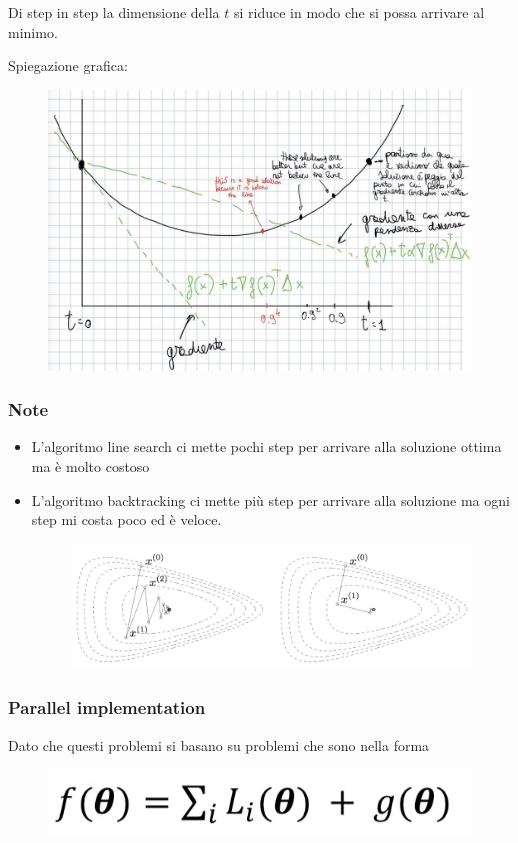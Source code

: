 \documentclass[14pt]{extreport}
\begin{document}
Di step in step la dimensione della $t$ si riduce in modo che si possa arrivare al minimo.

Spiegazione grafica: 

\begin{figure}[H]
\centering
\includegraphics[width=0.7\linewidth]{244.jpeg}
\end{figure}

\subsubsection{Note}

\begin{itemize}
\item L'algoritmo line search ci mette pochi step per arrivare alla soluzione ottima ma è molto costoso
\item L'algoritmo backtracking ci mette più step per arrivare alla soluzione ma ogni step mi costa poco ed è veloce. \begin{figure}[H]
\centering
\includegraphics[width=0.7\linewidth]{243.jpeg}
\end{figure}
\end{itemize}

\subsubsection{Parallel implementation}

Dato che questi problemi si basano su problemi che sono nella forma

\begin{figure}[H]
\centering
\includegraphics[width=0.7\linewidth]{245.jpeg}
\end{figure}
\end{document}
